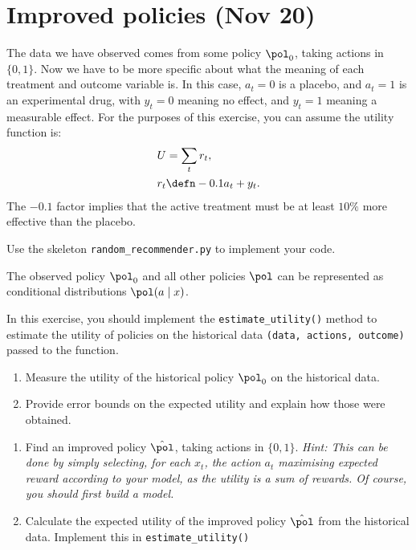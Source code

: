 \section{Improved policies (Nov 20)}

The data we have observed comes from some policy $\pol_0$, taking actions in $\{0,1\}$. Now we have to be more specific about what the meaning of each treatment and outcome variable is. In this case, $a_t = 0$ is a placebo, and $a_t = 1$ is an experimental drug, with $y_t = 0$ meaning no effect, and $y_t = 1$ meaning a measurable effect. For the purposes of this exercise, you can assume the utility function is:
\begin{align}
  U &= \sum_t r_t,\\
  r_t &\defn - 0.1 a_t + y_t.
\end{align}
The $-0.1$ factor implies that the active treatment must be at least $10\%$ more effective than the placebo.

Use the skeleton \verb!random_recommender.py! to implement your code.

\begin{assumption}
  The observed policy $\pol_0$ and all other policies $\pol$ can be represented as conditional distributions $\pol(a \mid x)$. 
\end{assumption}

\begin{exercise}
  In this exercise, you should implement the \verb!estimate_utility()! method to estimate the utility of policies on the historical data \verb!(data, actions, outcome)! passed to the function.
    \begin{enumerate}
  \item Measure the utility of the historical policy $\pol_0$ on the historical
    data.
  \item Provide error bounds on the expected utility and explain how those were obtained.
  \end{enumerate}
\end{exercise}

\begin{exercise}
  \begin{enumerate}
  \item Find an improved policy $\hat{\pol}$, taking actions in $\{0,1\}$. \emph{Hint: This can be done by simply selecting, for each $x_t$, the action $a_t$ maximising expected reward according to your model, as the utility is a sum of rewards. Of course, you should first build a model.}
  \item Calculate the expected utility of the improved policy $\hat{\pol}$ from the historical data. Implement this in \verb!estimate_utility()!
  \end{enumerate}
\end{exercise}

